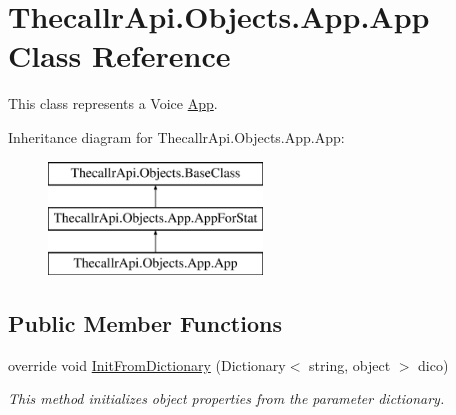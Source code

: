 \hypertarget{class_thecallr_api_1_1_objects_1_1_app_1_1_app}{\section{Thecallr\+Api.\+Objects.\+App.\+App Class Reference}
\label{class_thecallr_api_1_1_objects_1_1_app_1_1_app}
}


This class represents a Voice \hyperlink{class_thecallr_api_1_1_objects_1_1_app_1_1_app}{App}.  


Inheritance diagram for Thecallr\+Api.\+Objects.\+App.\+App\+:\begin{figure}[H]
\begin{center}
\leavevmode
\includegraphics[height=3.000000cm]{class_thecallr_api_1_1_objects_1_1_app_1_1_app}
\end{center}
\end{figure}
\subsection*{Public Member Functions}
\begin{DoxyCompactItemize}
\item 
override void \hyperlink{class_thecallr_api_1_1_objects_1_1_app_1_1_app_a006d5cc3bccc77b67b8afb1018c15845}{Init\+From\+Dictionary} (Dictionary$<$ string, object $>$ dico)
\begin{DoxyCompactList}\small\item\em This method initializes object properties from the parameter dictionary. \end{DoxyCompactList}\end{DoxyCompactItemize}
